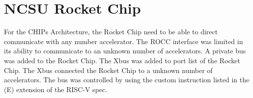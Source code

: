 \documentclass[../main.tex]{subfiles}
\begin{document}
\section{NCSU Rocket Chip}
For the CHIPs Architecture, the Rocket Chip need to be able to direct communicate with any number accelerator. The ROCC interface was limited in its ability to communicate to an unknown number of accelerators. A private bus was added to the Rocket Chip. The Xbus was added to port list of the Rocket Chip. The Xbus connected the Rocket Chip to a unknown number of accelerators. The bus was controlled by using the custom instruction listed in the (E) extension of the RISC-V spec. 
\end{document}
